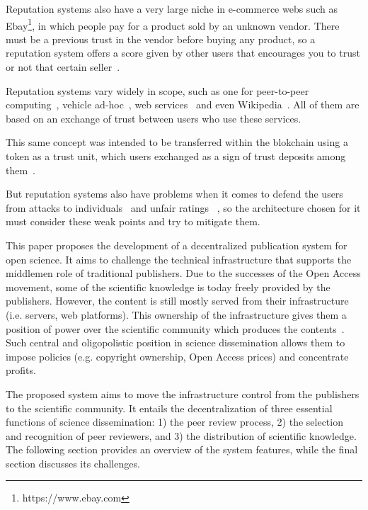Reputation systems also have a very large niche in e-commerce webs such as
Ebay\footnote{https://www.ebay.com}, in which people pay for a product sold by
an unknown vendor. There must be a previous trust in the vendor before buying
any product, so a reputation system offers a score given by other users that
encourages you to trust or not that certain seller~\cite{resnick2002trust}.

Reputation systems vary widely in scope, such as one for peer-to-peer
computing~\cite{zhou2007powertrust}, vehicle ad-hoc~\cite{dotzer2005vars}, web
services~\cite{moore2008reputation} and even Wikipedia~\cite{adler2007content}.
All of them are based on an exchange of trust between users who use these
services.

This same concept was intended to be transferred within the blokchain using a
token as a trust unit, which users exchanged as a sign of trust deposits among
them~\cite{sharples2016blockchain}.

But reputation systems also have problems when it comes to defend the users from
attacks to individuals~\cite{hoffman2009survey} and unfair ratings
~\cite{whitby2004filtering}, so the architecture chosen for it must consider
these weak points and try to mitigate them.

This paper proposes the development of a decentralized publication system for
open science. It aims to challenge the technical infrastructure that supports
the middlemen role of traditional publishers. Due to the successes of the Open
Access movement, some of the scientific knowledge is today freely provided by
the publishers. However, the content is still mostly served from their
infrastructure (i.e. servers, web platforms). This ownership of the
infrastructure gives them a position of power over the scientific community
which produces the contents~\cite{fuster2010governance}. Such central and
oligopolistic position in science dissemination allows them to impose policies
(e.g. copyright ownership, Open Access prices) and concentrate profits.

The proposed system aims to move the infrastructure control from the publishers
to the scientific community. It entails the decentralization of three essential
functions of science dissemination: 1) the peer review process, 2) the selection
and recognition of peer reviewers, and 3) the distribution of scientific
knowledge. The following section provides an overview of the system features,
while the final section discusses its challenges.
